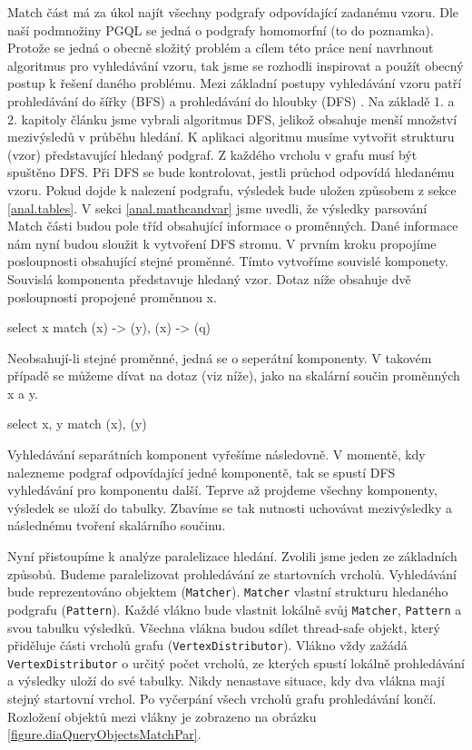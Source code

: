 Match část má za úkol najít všechny podgrafy odpovídající zadanému vzoru.
Dle naší podmnožiny PGQL se jedná o podgrafy homomorfní (to do poznamka).
Protože se jedná o obecně složitý problém a cílem této práce není navrhnout algoritmus pro vyhledávání vzoru, tak jsme se rozhodli inspirovat a použít obecný postup k řešení daného problému. 
Mezi základní postupy vyhledávání vzoru patří prohledávání do šířky (BFS) a prohledávání do hloubky (DFS) \citep[kap. 4]{graphAlg}. 
Na základě 1. a 2. kapitoly článku \citet{asyncPGX} jsme vybrali algoritmus DFS, jelikož obsahuje menší množství mezivýsledů v průběhu hledání.
K aplikaci algoritmu musíme vytvořit strukturu (vzor) představující hledaný podgraf.
Z každého vrcholu v grafu musí být spuštěno DFS.
Při DFS se bude kontrolovat, jestli průchod odpovídá hledanému vzoru.
Pokud dojde k nalezení podgrafu, výsledek bude uložen způsobem z sekce \ref{anal.tables}.
V sekci \ref{anal.mathcandvar} jsme uvedli, že výsledky parsování Match části budou pole tříd obsahující informace o proměnných.
Dané informace nám nyní budou sloužit k vytvoření DFS stromu.
V prvním kroku propojíme posloupnosti obsahující stejné proměnné.
Tímto vytvoříme souvislé komponety.
Souvislá komponenta představuje hledaný vzor.
Dotaz níže obsahuje dvě posloupnosti propojené proměnnou x.
\begin{code}
select x match (x) -> (y), (x) -> (q)
\end{code}
Neobsahují-li stejné proměnné, jedná se o seperátní komponenty.
V takovém případě se můžeme dívat na dotaz (viz níže), jako na skalární součin proměnných x a y.
\begin{code}
select x, y match (x), (y)
\end{code}
Vyhledávání separátních komponent vyřešíme následovně.
V momentě, kdy nalezneme podgraf odpovídající jedné komponentě, tak se spustí DFS vyhledávání pro komponentu další.
Teprve až projdeme všechny komponenty, výsledek se uloží do tabulky.
Zbavíme se tak nutnosti uchovávat mezivýsledky a následnému tvoření skalárního součinu.

Nyní přistoupíme k analýze paralelizace hledání.
Zvolili jsme jeden ze základních způsobů.
Budeme paralelizovat prohledávání ze startovních vrcholů.
Vyhledávání bude reprezentováno objektem (\texttt{Matcher}).
\texttt{Matcher} vlastní strukturu hledaného podgrafu (\texttt{Pattern}).
Každé vlákno bude vlastnit lokálně svůj \texttt{Matcher}, \texttt{Pattern} a svou tabulku výsledků.
Všechna vlákna budou sdílet thread-safe objekt, který přiděluje části vrcholů grafu (\texttt{VertexDistributor}).
Vlákno vždy zažádá \texttt{VertexDistributor} o určitý počet vrcholů, ze kterých spustí lokálně prohledávání a výsledky uloží do své tabulky.
Nikdy nenastave situace, kdy dva vlákna mají stejný startovní vrchol.
Po vyčerpání všech vrcholů grafu prohledávání končí.
Rozložení objektů mezi vlákny je zobrazeno na obrázku \ref{figure.diaQueryObjectsMatchPar}. 

